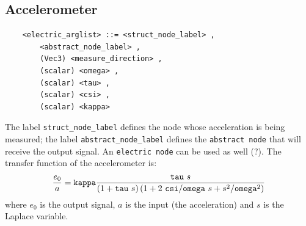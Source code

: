 \documentclass[10pt,dvips]{report}
\begin{document}
\subsection{Accelerometer}
  \begin{verbatim}
    <electric_arglist> ::= <struct_node_label> ,
        <abstract_node_label> ,
        (Vec3) <measure_direction> ,
        (scalar) <omega> ,
        (scalar) <tau> ,
        (scalar) <csi> ,
        (scalar) <kappa>	
  \end{verbatim}
  The label {\tt struct\_node\_label} defines the node whose acceleration 
  is being measured; the label {\tt abstract\_node\_label} defines the
  {\tt abstract node} that will receive the output signal. 
  An {\tt electric node} can be used as well (?).
  The transfer function of the accelerometer is:
  \begin{displaymath}
    \frac{e_0}{a} = {\tt kappa}\frac{{\tt tau} \ s}{
      \left( 1+{\tt tau} \ s \right)
      \left( 1+2 \ {\tt csi}/{\tt omega} \ s+s^2/{\tt omega}^2 \right)
    }
  \end{displaymath}
  where $ e_0 $ is the output signal, $ a $ is the input (the acceleration)
  and $ s $ is the Laplace variable.
\end{document}
